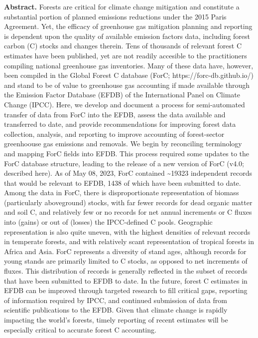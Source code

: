 \documentclass[, manuscript]{copernicus}
\begin{document}
\textbf{Abstract.} Forests are critical for climate change mitigation
and constitute a substantial portion of planned emissions reductions
under the 2015 Paris Agreement. Yet, the efficacy of greenhouse gas
mitigation planning and reporting is dependent upon the quality of
available emission factors data, including forest carbon (C) stocks and
changes therein. Tens of thousands of relevant forest C estimates have
been published, yet are not readily accesible to the practitioners
compiling national greenhouse gas inventories. Many of these data have,
however, been compiled in the Global Forest C database (ForC;
https://forc-db.github.io/) and stand to be of value to greenhouse gas
accounting if made available through the Emission Factor Database (EFDB)
of the International Panel on Climate Change (IPCC). Here, we develop
and document a process for semi-automated transfer of data from ForC
into the EFDB, assess the data available and transferred to date, and
provide recommendations for improving forest data collection, analysis,
and reporting to improve accounting of forest-sector greenhoouse gas
emissions and removals. We begin by reconciling terminology and mapping
ForC fields into EFDB. This process required some updates to the ForC
database structure, leading to the release of a new version of ForC
(v4.0; described here). As of May 08, 2023, ForC contained
\textasciitilde19323 independent records that would be relevant to EFDB,
1438 of which have been submitted to date. Among the data in ForC, there
is disproportionate representation of biomass (particularly aboveground)
stocks, with far fewer records for dead organic matter and soil C, and
relatively few or no records for net annual increments or C fluxes into
(gains) or out of (losses) the IPCC-defined C pools. Geographic
representation is also quite uneven, with the highest densities of
relevant records in temperate forests, and with relatively scant
representation of tropical forests in Africa and Asia. ForC represents a
diversity of stand ages, although records for young stands are primarily
limited to C stocks, as opposed to net increments of fluxes. This
distribution of records is generally reflected in the subset of records
that have been submitted to EFDB to date. In the future, forest C
estimates in EFDB can be improved through targeted research to fill
critical gaps, reporting of information required by IPCC, and continued
submission of data from scientific publications to the EFDB. Given that
climate change is rapidly impacting the world's forests, timely
reporting of recent estimates will be especially critical to accurate
forest C accounting.
\end{document}
